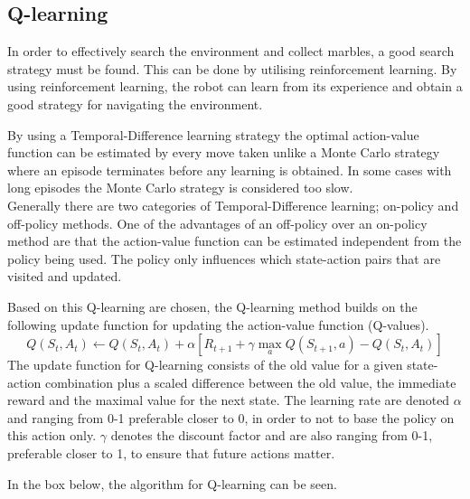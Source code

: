 \documentclass[../Head/Main.tex]{subfiles}
\begin{document}
\subsection{Q-learning}
In order to effectively search the environment and collect marbles, a good search strategy must be found. This can be done by utilising reinforcement learning. By using reinforcement learning, the robot can learn from its experience and obtain a good strategy for navigating the environment.\par
By using a Temporal-Difference learning strategy the optimal action-value function can be estimated by every move taken unlike a Monte Carlo strategy where an episode terminates before any learning is obtained. In some cases with long episodes the Monte Carlo strategy is considered too slow.\\
Generally there are two categories of Temporal-Difference learning; on-policy and off-policy methods. One of the advantages of an off-policy over an on-policy method are that the action-value function can be estimated independent from the policy being used. The policy only influences which state-action pairs that are visited and updated.\par 
Based on this Q-learning are chosen, the Q-learning method builds on the following update function for updating the action-value function (Q-values).
\begin{equation}\label{eq:q_update_func}
Q\left(S_t,A_t\right) \leftarrow Q\left(S_t,A_t\right) + \alpha\left[R_{t+1}+\gamma\max_a Q\left(S_{t+1},a\right)-Q\left(S_t,A_t\right)\right]
\end{equation}
The update function for Q-learning consists of the old value for a given state-action combination plus a scaled difference between the old value, the immediate reward and the maximal value for the next state. The learning rate are denoted $\alpha$ and ranging from 0-1 preferable closer to 0, in order to not to base the policy on this action only. $\gamma$ denotes the discount factor and are also ranging from 0-1, preferable closer to 1, to ensure that future actions matter.\par
In the box below, the algorithm for Q-learning can be seen.
\end{document}
